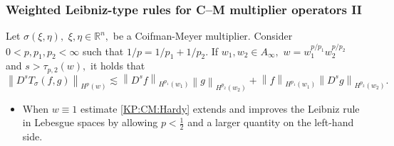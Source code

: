 \documentclass[xcolor=dvipsnames]{beamer}
\newcommand{\rn}{{{\mathbb R}^n}}
\newcommand{\norm}[2]{{\left\| #1 \right\|}_{#2}}
\newcommand{\hcline}{1/p=1/p_1+1/p_2}
\begin{document}
\begin{frame}\frametitle{Weighted Leibniz-type rules for C--M multiplier operators II}



\begin{corollary}\label{coro:KP:CM:Hardy}
Let $\sigma(\xi,\eta),$ $\xi,\eta\in\rn,$ be a Coifman-Meyer multiplier. 
Consider  $0 < p, p_1, p_2  < \infty$  such that $\hcline.$ If  $w_1,w_2\in A_\infty,$  $w=w_1^{{p}/{p_1}} w_2^{{p}/{p_2}}$ and   $s > \tau_{p,2}(w),$ it holds that
\begin{equation*}\label{KP:CM:Hardy}
\norm{D^sT_\sigma(f,g)}{H^p(w)} \lesssim \norm{D^s f}{H^{p_1}(w_1)} \norm{g}{H^{p_2}(w_2)} +  \norm{f}{H^{p_1}(w_1)}   \norm{D^s g}{H^{p_2}(w_2)}.
\end{equation*}
\end{corollary}

\medskip
\begin{itemize}



\item When $w \equiv 1$ estimate \ref{KP:CM:Hardy} extends and improves the Leibniz rule in Lebesgue spaces by allowing $p<\frac{1}{2}$ and a larger quantity on the left-hand side.

\end{itemize}
\end{frame}
\end{document}
